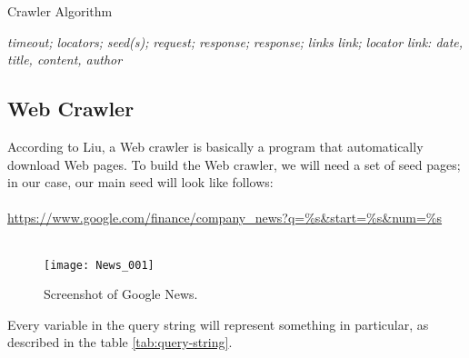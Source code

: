 \begin{algorithm}
\caption{Crawler Algorithm}\label{crawlerAlgorithm}
\begin{algorithmic}[1]
\STATE {} \textit{timeout;}
\STATE {} \textit{locators;}
\STATE {} \textit{seed(s);}
\STATE {} \textit{request;}
\STATE {} \textit{response;}
\STATE {} \textit{response;}
\STATE {} \textit{links}  
	\STATE {} \textit{link;}
	\STATE {} \textit{locator} 
	\STATE {} \textit{link: date, title, content, author}\text{;}
	\STATE {}
\ENDFOR
\end{algorithmic}
\end{algorithm}

\subsection{Web Crawler}\label{webCrawler}

According to Liu, \cite[p. 311]{L2011} a Web \gls{crawler} is basically a program that automatically download Web pages. To build the Web \gls{crawler}, we will need a set of seed pages; in our case, our main seed will look like follows: 
\\\\
\url{https://www.google.com/finance/company\_news?q=\%s&start=\%s&num=\%s}
\\\\

	\begin{figure}\centering
		\texttt{[image: News\_001]}
		\caption{Screenshot of Google News.}\label{fig:News_001}
	\end{figure}

Every variable in the \gls{query string} will represent something in particular, as described in  the table \ref{tab:query-string}.

